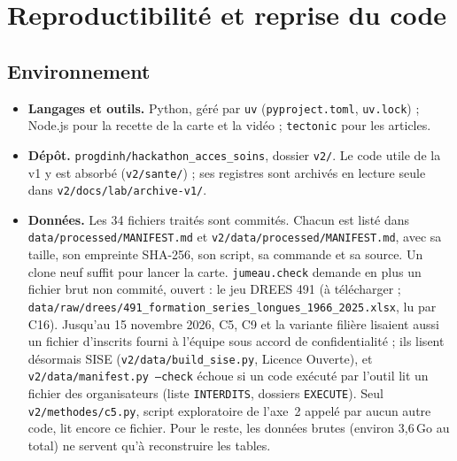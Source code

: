 \section{Reproductibilité et reprise du code}\label{sec:repro-ref}

\subsection{Environnement}
\begin{itemize}
\item \textbf{Langages et outils.} Python, géré par \texttt{uv} (\texttt{pyproject.toml}, \texttt{uv.lock}) ;
  Node.js pour la recette de la carte et la vidéo ; \texttt{tectonic} pour les articles.
\item \textbf{Dépôt.} \texttt{progdinh/hackathon\_acces\_soins}, dossier \texttt{v2/}. Le code utile de la v1 y
  est absorbé (\texttt{v2/sante/}) ; ses registres sont archivés en lecture seule dans
  \texttt{v2/docs/lab/archive-v1/}.
\item \textbf{Données.} Les 34 fichiers traités sont commités. Chacun est listé dans
  \texttt{data/processed/MANIFEST.md} et \texttt{v2/data/processed/MANIFEST.md}, avec sa taille, son empreinte
  SHA-256, son script, sa commande et sa source. Un clone neuf suffit pour lancer la carte. \texttt{jumeau.check} demande en plus un
  fichier brut non commité, ouvert : le jeu DREES 491 (à télécharger ;
  \texttt{data/raw/drees/491\_formation\_series\_longues\_1966\_2025.xlsx}, lu par C16). Jusqu'au 15 novembre 2026,
  C5, C9 et la variante filière lisaient aussi un fichier d'inscrits fourni à l'équipe sous accord de
  confidentialité ; ils lisent désormais SISE (\texttt{v2/data/build\_sise.py}, Licence Ouverte), et
  \texttt{v2/data/manifest.py --check} échoue si un code exécuté par l'outil lit un fichier des organisateurs
  (liste \texttt{INTERDITS}, dossiers \texttt{EXECUTE}). Seul \texttt{v2/methodes/c5.py}, script exploratoire de
  l'axe~2 appelé par aucun autre code, lit encore ce fichier. Pour le reste, les données brutes (environ 3,6\,Go\mesure{} au total) ne servent qu'à reconstruire les
  tables.
\end{itemize}

